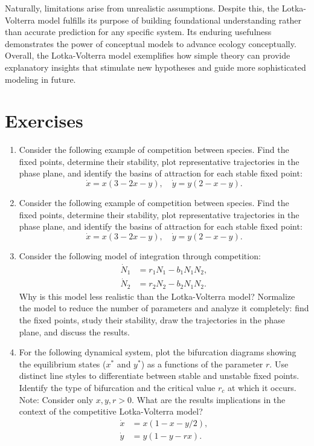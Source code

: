 Naturally, limitations arise from unrealistic assumptions. Despite this, the Lotka-Volterra model fulfills its purpose of building foundational understanding rather than accurate prediction for any specific system. Its enduring usefulness demonstrates the power of conceptual models to advance ecology conceptually. Overall, the Lotka-Volterra model exemplifies how simple theory can provide explanatory insights that stimulate new hypotheses and guide more sophisticated modeling in future.

\section*{Exercises}

\begin{enumerate}
    \item Consider the following example of competition between species. Find the fixed points, determine their stability, plot representative trajectories in the phase plane, and identify the basins of attraction for each stable fixed point: 
    \begin{equation*}
        \dot{x}=x(3-2x-y), \quad \dot{y}=y(2-x-y).
    \end{equation*}
  
    \item Consider the following example of competition between species. Find the fixed points, determine their stability, plot representative trajectories in the phase plane, and identify the basins of attraction for each stable fixed point: 
    \begin{equation*}
        \dot{x}=x(3-2x-y), \quad \dot{y}=y(2-x-y).
    \end{equation*}
  
    \item Consider the following model of integration through competition: 
    \begin{align*}
    \dot{N}_1&=r_1 N_1-b_1 N_1 N_{2}, \\
    \dot{N}_2&=r_2 N_2-b_2 N_1 N_2.
    \end{align*}
    Why is this model less realistic than the Lotka-Volterra model? Normalize the model to reduce the number of parameters and analyze it completely: find the fixed points, study their stability, draw the trajectories in the phase plane, and discuss the results.

    \item For the following dynamical system, plot the bifurcation diagrams showing the equilibrium states ($x^*$ and $y^*$) as a functions of the parameter $r$. Use distinct line styles to differentiate between stable and unstable fixed points. Identify the type of bifurcation and the critical value $r_c$ at which it occurs. Note: Consider only $x, y, r > 0$. What are the results implications in the context of the competitive Lotka-Volterra model?
    \begin{align*}
        \dot{x} &= x(1-x-y/2), \\
        \dot{y} &= y(1-y-rx).
    \end{align*}
\end{enumerate}